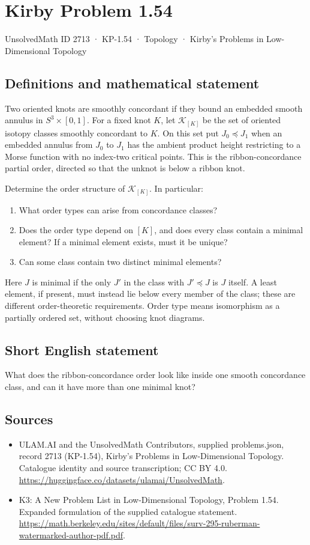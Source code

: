 \documentclass[11pt,a4paper]{article}
\begin{document}
\section*{Kirby Problem 1.54}\label{2713}
{\small UnsolvedMath ID 2713 · KP-1.54 · Topology · Kirby's Problems in Low-Dimensional Topology}
\subsection{Definitions and mathematical statement}
Two oriented knots are smoothly concordant if they bound an embedded smooth
annulus in $S^3\times[0,1]$. For a fixed knot $K$, let $\mathscr K_{[K]}$ be the
set of oriented isotopy classes smoothly concordant to $K$.
On this set put $J_0\preceq J_1$ when an embedded annulus from $J_0$ to $J_1$
has the ambient product height restricting to a Morse function with no
index-two critical points. This is the ribbon-concordance
partial order, directed so that the unknot is below a ribbon knot.

Determine the order structure of $\mathscr K_{[K]}$. In particular:
\begin{enumerate}
\item What order types can arise from concordance classes?
\item Does the order type depend on $[K]$, and does every class contain a minimal
element? If a minimal element exists, must it be unique?
\item Can some class contain two distinct minimal elements?
\end{enumerate}
Here $J$ is minimal if the only $J'$ in the class with $J'\preceq J$ is $J$
itself. A least element, if present, must instead lie below every member of the
class; these are different order-theoretic requirements. Order type means
isomorphism as a partially ordered set, without choosing knot diagrams.
\subsection{Short English statement}
What does the ribbon-concordance order look like inside one smooth concordance class, and can it have more than one minimal knot?
\subsection{Sources}
\begin{itemize}
\item[S1] ULAM.AI and the UnsolvedMath Contributors, supplied problems.json, record 2713 (KP-1.54), Kirby's Problems in Low-Dimensional Topology. Catalogue identity and source transcription; CC BY 4.0.
\url{https://huggingface.co/datasets/ulamai/UnsolvedMath}.
\item[S2] K3: A New Problem List in Low-Dimensional Topology, Problem 1.54. Expanded formulation of the supplied catalogue statement.
\url{https://math.berkeley.edu/sites/default/files/surv-295-ruberman-watermarked-author-pdf.pdf}.
\end{itemize}
\end{document}
